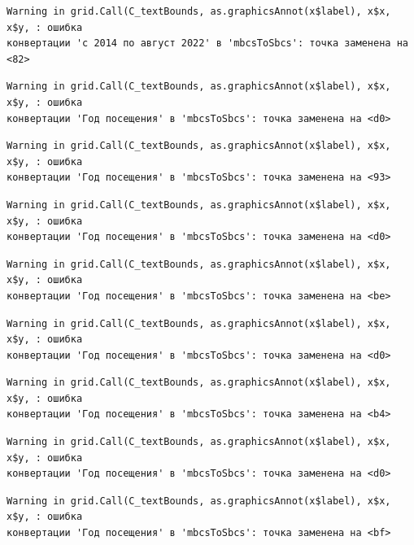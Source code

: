 \documentclass[
  letterpaper,
  DIV=11,
  numbers=noendperiod]{scrreprt}
\begin{document}
\begin{verbatim}
Warning in grid.Call(C_textBounds, as.graphicsAnnot(x$label), x$x, x$y, : ошибка
конвертации 'с 2014 по август 2022' в 'mbcsToSbcs': точка заменена на <82>
\end{verbatim}

\begin{verbatim}
Warning in grid.Call(C_textBounds, as.graphicsAnnot(x$label), x$x, x$y, : ошибка
конвертации 'Год посещения' в 'mbcsToSbcs': точка заменена на <d0>
\end{verbatim}

\begin{verbatim}
Warning in grid.Call(C_textBounds, as.graphicsAnnot(x$label), x$x, x$y, : ошибка
конвертации 'Год посещения' в 'mbcsToSbcs': точка заменена на <93>
\end{verbatim}

\begin{verbatim}
Warning in grid.Call(C_textBounds, as.graphicsAnnot(x$label), x$x, x$y, : ошибка
конвертации 'Год посещения' в 'mbcsToSbcs': точка заменена на <d0>
\end{verbatim}

\begin{verbatim}
Warning in grid.Call(C_textBounds, as.graphicsAnnot(x$label), x$x, x$y, : ошибка
конвертации 'Год посещения' в 'mbcsToSbcs': точка заменена на <be>
\end{verbatim}

\begin{verbatim}
Warning in grid.Call(C_textBounds, as.graphicsAnnot(x$label), x$x, x$y, : ошибка
конвертации 'Год посещения' в 'mbcsToSbcs': точка заменена на <d0>
\end{verbatim}

\begin{verbatim}
Warning in grid.Call(C_textBounds, as.graphicsAnnot(x$label), x$x, x$y, : ошибка
конвертации 'Год посещения' в 'mbcsToSbcs': точка заменена на <b4>
\end{verbatim}

\begin{verbatim}
Warning in grid.Call(C_textBounds, as.graphicsAnnot(x$label), x$x, x$y, : ошибка
конвертации 'Год посещения' в 'mbcsToSbcs': точка заменена на <d0>
\end{verbatim}

\begin{verbatim}
Warning in grid.Call(C_textBounds, as.graphicsAnnot(x$label), x$x, x$y, : ошибка
конвертации 'Год посещения' в 'mbcsToSbcs': точка заменена на <bf>
\end{verbatim}
\end{document}
